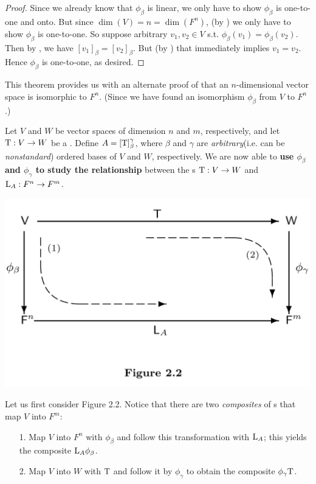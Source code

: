 \begin{proof}
Since we already know that \(\phi_{\beta}\) is linear, we only have to show \(\phi_{\beta}\) is one-to-one and onto.
But since \(\dim(V) = n = \dim(F^n)\), (by ) we only have to show \(\phi_{\beta}\) is one-to-one.
So suppose arbitrary \(v_1, v_2 \in V\) s.t. \(\phi_{\beta}(v_1) = \phi_{\beta}(v_2)\).
Then by , we have \([v_1]_{\beta} = [v_2]_{\beta}\).
But (by ) that immediately implies \(v_1 = v_2\).
Hence \(\phi_{\beta}\) is one-to-one, as desired.
\end{proof}

\begin{remark} \label{remark 2.4.4}
This theorem provides us with an alternate proof of  that an \(n\)-dimensional vector space is isomorphic to \(F^n\).
(Since we have found an isomorphism \(\phi_{\beta}\) from \(V\) to \(F^n\).)
\end{remark}

Let \(V\) and \(W\) be vector spaces of dimension \(n\) and \(m\), respectively, and let \(\mathrm{T} : V \to W\) be a \LTRAN{}.
Define \(A = [\mathrm{T}]_{\beta}^{\gamma}\), where \(\beta\) and \(\gamma\) are \emph{arbitrary}(i.e. can be \emph{nonstandard}) ordered bases of \(V\) and \(W\), respectively.
We are now able to \textbf{use \(\phi_{\beta}\) and \(\phi_{\gamma}\) to study the relationship} between the \LTRAN{}s \(\mathrm{T} : V \to W\) and
\(\mathrm{L}_A: F^n \to F^m\).

\includegraphics[width=16cm]{images/figure-2-2.png}

Let us first consider Figure 2.2.
Notice that there are two \emph{composites} of \LTRAN{}s that map \(V\) into \(F^m\):
\begin{enumerate}
\item[1.] Map \(V\) into \(F^n\) with \(\phi_{\beta}\) and follow this transformation with \(\mathrm{L}_A\);
    this yields the composite \(\mathrm{L}_A \phi_{\beta}\).
\item[2.] Map \(V\) into \(W\) with \(\mathrm{T}\) and follow it by \(\phi_{\gamma}\) to obtain the composite \(\phi_{\gamma} \mathrm{T}\).
\end{enumerate}

